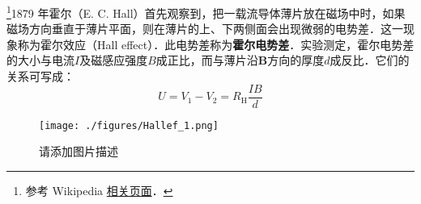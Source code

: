 
\begin{issues}
\issueDraft
\end{issues}

\footnote{参考 Wikipedia \href{https://en.wikipedia.org/wiki/Hall_effect}{相关页面}．}1879 年霍尔（E. C. Hall）首先观察到，把一载流导体薄片放在磁场中时，如果磁场方向垂直于薄片平面，则在薄片的上、下两侧面会出现微弱的电势差．这一现象称为霍尔效应（Hall effect）．此电势差称为\textbf{霍尔电势差}．实验测定，霍尔电势差的大小与电流$I$及磁感应强度$B$成正比，而与薄片沿$\mathbf B$方向的厚度$d$成反比．它们的关系可写成：
\begin{equation}
U = V_{1}-V_{2}=R_{\mathrm{H}} \frac{I B}{d}
\end{equation}

\begin{figure}[ht]
\centering
\texttt{[image: ./figures/Hallef\_1.png]}
\caption{请添加图片描述} \label{Hallef_fig1}
\end{figure}

